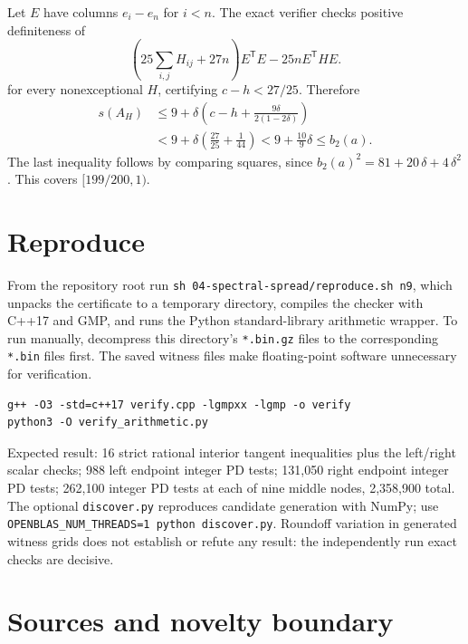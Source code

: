 \documentclass[11pt]{article}
\begin{document}
Let \(E\) have columns \(e_i-e_n\) for \(i<n\). The exact verifier checks positive definiteness of
\[
\left(25\sum_{i,j}H_{ij}+27n\right)E^{\mathsf T}E-25nE^{\mathsf T}HE.
\]
for every nonexceptional \(H\), certifying \(c-h<27/25\). Therefore
\[
\begin{aligned}s(A_H)&\le 9+\delta\left(c-h+\frac{9\delta}{2(1-2\delta)}\right)\\&<9+\delta\left(\frac{27}{25}+\frac1{44}\right)<9+\frac{10}{9}\delta\le b_2(a).\end{aligned}
\]
The last inequality follows by comparing squares, since \(b_2(a)^2=81+20\,\delta +4\,\delta ^2\). This covers \([199/200,1)\).

\section{Reproduce}\label{reproduce}

From the repository root run \texttt{sh\ 04-spectral-spread/reproduce.sh\ n9}, which unpacks the certificate to a temporary directory, compiles the checker with C++17 and GMP, and runs the Python standard-library arithmetic wrapper. To run manually, decompress this directory's \texttt{*.bin.gz} files to the corresponding \texttt{*.bin} files first. The saved witness files make floating-point software unnecessary for verification.

\begin{verbatim}
g++ -O3 -std=c++17 verify.cpp -lgmpxx -lgmp -o verify
python3 -O verify_arithmetic.py
\end{verbatim}

Expected result: 16 strict rational interior tangent inequalities plus the left/right scalar checks; 988 left endpoint integer PD tests; 131,050 right endpoint integer PD tests; 262,100 integer PD tests at each of nine middle nodes, 2,358,900 total. The optional \texttt{discover.py} reproduces candidate generation with NumPy; use \texttt{OPENBLAS\_NUM\_THREADS=1\ python\ discover.py}. Roundoff variation in generated witness grids does not establish or refute any result: the independently run exact checks are decisive.

\section{Sources and novelty boundary}\label{sources-and-novelty-boundary}
\end{document}
